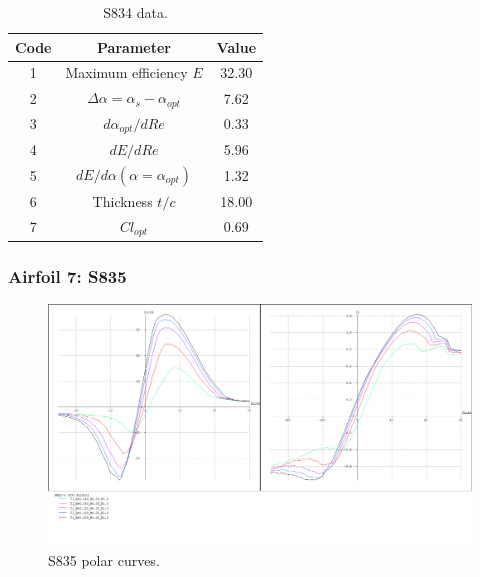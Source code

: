 \documentclass[../TFG_Annex.tex]{subfiles}
\begin{document}
\begin{table}[h!]
	\centering
	\begin{tabular}{c|c|c}
		Code & Parameter                                    & Value  \\ \hline
		1    & Maximum efficiency $E$                      &      32.30         \\
		2    & $\Delta \alpha=\alpha_{s}-\alpha_{opt}$    &           7.62          \\
		3    & ${d\alpha_{opt}}/{dRe}$                     &             0.33     \\
		4    & ${dE}/{dRe}$                                &        5.96           \\
		5    & ${dE}/{d \alpha} (\alpha=\alpha_{opt})$      &           1.32        \\
		6    & Thickness $t/c$                            &              18.00      \\
		7    & $Cl_{opt}$  &   0.69
	\end{tabular}
	\caption{S834 data.}
	\label{tab:Airf6}
\end{table}






\newpage
\subsubsection{Airfoil 7: S835}

\begin{figure}[h!]
	\centering
	\includegraphics[width=1\linewidth]{"../../04-Airfoil selection/Imatges airfoils/7-S835"}
	\caption{S835 polar curves.}
	\label{fig:7-s835}
\end{figure}
\end{document}
